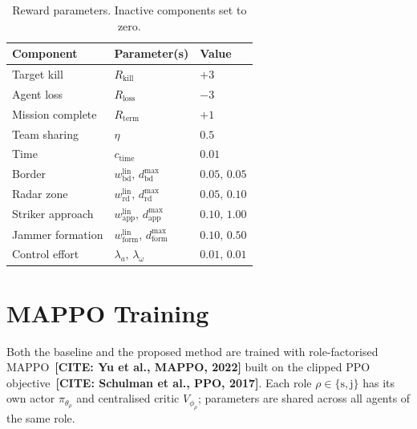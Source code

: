 \begin{table}[H]
\centering
\caption{Reward parameters. Inactive components set to zero.}
\label{tab:reward_params}
\begin{tabular}{@{}lll@{}}
\toprule
Component & Parameter(s) & Value \\ \midrule
Target kill                    & $R_{\mathrm{kill}}$                               & $+3$ \\
Agent loss                     & $R_{\mathrm{loss}}$                               & $-3$ \\
Mission complete               & $R_{\mathrm{term}}$                               & $+1$ \\
Team sharing                   & $\eta$                                             & $0.5$ \\
Time                           & $c_{\mathrm{time}}$                                & $0.01$ \\
Border                         & $w^{\mathrm{lin}}_{\mathrm{bd}},\,d^{\max}_{\mathrm{bd}}$ & $0.05,\,0.05$ \\
Radar zone                     & $w^{\mathrm{lin}}_{\mathrm{rd}},\,d^{\max}_{\mathrm{rd}}$ & $0.05,\,0.10$ \\
Striker approach               & $w^{\mathrm{lin}}_{\mathrm{app}},\,d^{\max}_{\mathrm{app}}$ & $0.10,\,1.00$ \\
Jammer formation               & $w^{\mathrm{lin}}_{\mathrm{form}},\,d^{\max}_{\mathrm{form}}$ & $0.10,\,0.50$ \\
Control effort                 & $\lambda_{a},\,\lambda_{\omega}$                  & $0.01,\,0.01$ \\
\bottomrule
\end{tabular}
\end{table}

\section{MAPPO Training}
\label{sec:mappo}

Both the baseline and the proposed method are trained with role-factorised
MAPPO~\textbf{[CITE: Yu et al., MAPPO, 2022]} built on the clipped PPO
objective~\textbf{[CITE: Schulman et al., PPO, 2017]}. Each role $\rho\in\{\mathrm{s},\mathrm{j}\}$
has its own actor $\pi_{\theta_\rho}$ and centralised critic $V_{\phi_\rho}$;
parameters are shared across all agents of the same role.

